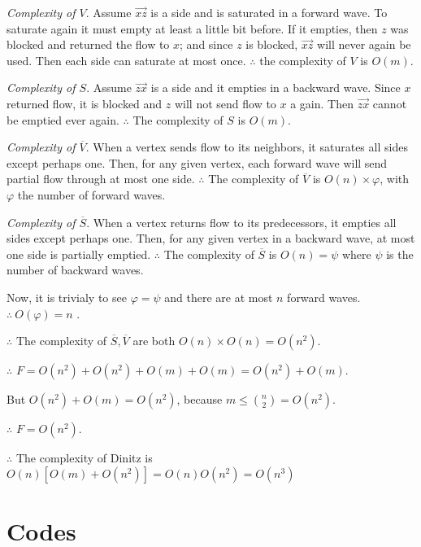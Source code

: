 \textit{Complexity of $V$}. Assume $\overrightarrow{xz}$ is a side and is
saturated in a forward wave. To saturate again it must empty at least a little
bit before. If it empties, then $z$ was blocked and returned the flow to $x$;
and since $z$ is blocked, $\overrightarrow{xz}$ will never again be used. Then
each side can saturate at most once. $\therefore $ the complexity of $V$ is
$O(m)$.

\textit{Complexity of $S$}. Assume  $\overrightarrow{zx}$ is a side and 
it empties in a backward wave. Since $x$  returned flow, it 
is blocked and $z$ will not send flow to $x$ a gain. Then $\overrightarrow{zx}$
cannot be emptied ever again. $\therefore $ The complexity of $S$ is $O(m)$.

\textit{Complexity of $\overline{V}$}. When a vertex sends flow to 
its neighbors, it saturates all sides except perhaps one.
Then, for any given vertex, each forward wave will send 
partial flow through at most one side. $\therefore $ The 
complexity of $\overline{V}$ is $O(n) \times \varphi$, with 
$\varphi$ the number of forward waves.

\textit{Complexity of $\overline{S}$}. When a vertex returns flow 
to its predecessors, it empties all sides except perhaps 
one. Then, for any given vertex in a backward wave, 
at most one side is partially emptied. $\therefore $ The 
complexity of $\overline{S}$ is $O(n) = \psi$ where $\psi$ 
is the number of backward waves.

Now, it is trivialy to see $\varphi = \psi$ and there are 
at most $n$ forward waves. $\therefore ~ O(\varphi) = n$ . 

$\therefore $ The complexity of $\overline{S}, \overline{V}$ are both 
$O(n) \times O(n) = O(n^2)$.

$\therefore $ $F = O(n^2) + O(n^2) + O(m) + O(m) = O(n^2) + O(m)$.

But $O(n^2) + O(m) = O(n^2)$, because $m \leq \binom{n}{2} = O(n^2)$.

$\therefore $ $F = O(n^2)$.

$\therefore $ The complexity of Dinitz is $O(n) \left[ O(m) + O(n^2) \right] = O(n)O(n^2) = O(n^3) $





\pagebreak

\section{Codes}

